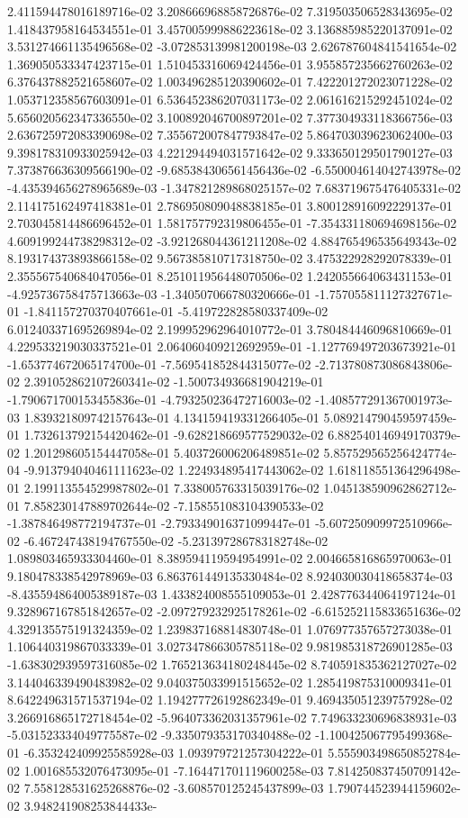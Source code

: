 2.411594478016189716e-02	3.208666968858726876e-02	7.319503506528343695e-02	1.418437958164534551e-01	3.457005999886223618e-02	3.136885985220137091e-02	3.531274661135496568e-02	-3.072853139981200198e-03	2.626787604841541654e-02	1.369050533347423715e-01	1.510453316069424456e-01	3.955857235662760263e-02	6.376437882521658607e-02	1.003496285120390602e-01	7.422201272023071228e-02	1.053712358567603091e-01	6.536452386207031173e-02	2.061616215292451024e-02	5.656020562347336550e-02	3.100892046700897201e-02	7.377304933118366756e-03	2.636725972083390698e-02	7.355672007847793847e-02	5.864703039623062400e-03	9.398178310933025942e-03	4.221294494031571642e-02	9.333650129501790127e-03	7.373876636309566190e-02	-9.685384306561456436e-02	-6.550004614042743978e-02	-4.435394656278965689e-03	-1.347821289868025157e-02	7.683719675476405331e-02	2.114175162497418381e-01	2.786950809048838185e-01	3.800128916092229137e-01	2.703045814486696452e-01	1.581757792319806455e-01	-7.354331180694698156e-02	4.609199244738298312e-02	-3.921268044361211208e-02	4.884765496535649343e-02	8.193174373893866158e-02	9.567385810717318750e-02	3.475322928292078339e-01	2.355567540684047056e-01	8.251011956448070506e-02	1.242055664063431153e-01	-4.925736758475713663e-03	-1.340507066780320666e-01	-1.757055811127327671e-01	-1.841157270370407661e-01	-5.419722828580337409e-02	6.012403371695269894e-02	2.199952962964010772e-01	3.780484446096810669e-01	4.229533219030337521e-01	2.064060409212692959e-01	-1.127769497203673921e-01	-1.653774672065174700e-01	-7.569541852844315077e-02	-2.713780873086843806e-02	2.391052862107260341e-02	-1.500734936681904219e-01	-1.790671700153455836e-01	-4.793250236472716003e-02	-1.408577291367001973e-03	1.839321809742157643e-01	4.134159419331266405e-01	5.089214790459597459e-01	1.732613792154420462e-01	-9.628218669577529032e-02	6.882540146949170379e-02	1.201298605154447058e-01	5.403726006206489851e-02	5.857529565256424774e-04	-9.913794040461111623e-02	1.224934895417443062e-02	1.618118551364296498e-01	2.199113554529987802e-01	7.338005763315039176e-02	1.045138590962862712e-01	7.858230147889702644e-02	-7.158551083104390533e-02	-1.387846498772194737e-01	-2.793349016371099447e-01	-5.607250909972510966e-02	-6.467247438194767550e-02	-5.231397286783182748e-02	1.089803465933304460e-01	8.389594119594954991e-02	2.004665816865970063e-01	9.180478338542978969e-03	6.863761449135330484e-02	8.924030030418658374e-03	-8.435594864005389187e-03	1.433824008555109053e-01	2.428776344064197124e-01	9.328967167851842657e-02	-2.097279232925178261e-02	-6.615252115833651636e-02	4.329135575191324359e-02	1.239837168814830748e-01	1.076977357657273038e-01	1.106440319867033339e-01	3.027347866305785118e-02	9.981985318726901285e-03	-1.638302939597316085e-02	1.765213634180248445e-02	8.740591835362127027e-02	3.144046339490483982e-02	9.040375033991515652e-02	1.285419875310009341e-01	8.642249631571537194e-02	1.194277726192862349e-01	9.469435051239757928e-02	3.266916865172718454e-02	-5.964073362031357961e-02	7.749633230696838931e-03	-5.031523334049775587e-02	-9.335079353170340488e-02	-1.100425067795499368e-01	-6.353242409925585928e-03	1.093979721257304222e-01	5.555903498650852784e-02	1.001685532076473095e-01	-7.164471701119600258e-03	7.814250837450709142e-02	7.558128531625268876e-02	-3.608570125245437899e-03	1.790744523944159602e-02	3.948241908253844433e-
